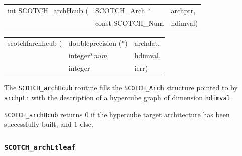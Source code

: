 \begin{itemize}
\progsyn

{\tt\begin{tabular}{l@{}ll}
int SCOTCH\_archHcub ( & SCOTCH\_Arch *    & archptr, \\
                       & const SCOTCH\_Num & hdimval)
\end{tabular}}

{\tt\begin{tabular}{l@{}ll}
scotchfarchhcub ( & doubleprecision (*) & archdat, \\
                  & integer*{\it num}   & hdimval, \\
                  & integer             & ierr)
\end{tabular}}

\progdes

The {\tt SCOTCH\_archHcub} routine fills the {\tt SCOTCH\_\lbt Arch}
structure pointed to by {\tt archptr} with the description of a
hypercube graph of dimension {\tt hdimval}.

\progret

{\tt SCOTCH\_archHcub} returns $0$ if the hypercube target
architecture has been successfully built, and $1$ else.
\end{itemize}

\subsubsection{{\tt SCOTCH\_archLtleaf}}

